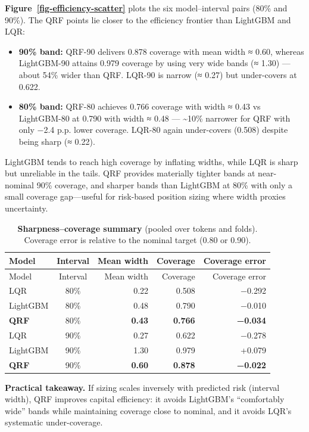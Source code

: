 \documentclass[
  a4paper,
  DIV=11,
  numbers=noendperiod]{scrreprt}
\providecommand{\tightlist}{%
  \setlength{\itemsep}{0pt}\setlength{\parskip}{0pt}}
\begin{document}
\textbf{Figure~\ref{fig-efficiency-scatter}} plots the six
model--interval pairs (80\% and 90\%). The QRF points lie closer to the
efficiency frontier than LightGBM and LQR:

\begin{itemize}
\tightlist
\item
  \textbf{90\% band:} QRF-90 delivers 0.878 coverage with mean width ≈
  0.60, whereas LightGBM-90 attains 0.979 coverage by using very wide
  bands (≈ 1.30) --- about 54\% wider than QRF. LQR-90 is narrow (≈
  0.27) but under-covers at 0.622.
\item
  \textbf{80\% band:} QRF-80 achieves 0.766 coverage with width ≈ 0.43
  vs LightGBM-80 at 0.790 with width ≈ 0.48 --- \textasciitilde10\%
  narrower for QRF with only −2.4 p.p. lower coverage. LQR-80 again
  under-covers (0.508) despite being sharp (≈ 0.22).
\end{itemize}

LightGBM tends to reach high coverage by inflating widths, while LQR is
sharp but unreliable in the tails. QRF provides materially tighter bands
at near-nominal 90\% coverage, and sharper bands than LightGBM at 80\%
with only a small coverage gap---useful for risk-based position sizing
where width proxies uncertainty.

\begin{longtable}[]{@{}lcrrr@{}}
\caption{\textbf{Sharpness--coverage summary} (pooled over tokens and
folds). Coverage error is relative to the nominal target (0.80 or
0.90).}\label{tbl-efficiency-summary}\tabularnewline
\toprule\noalign{}
Model & Interval & Mean width & Coverage & Coverage error \\
\midrule\noalign{}
\endfirsthead
\toprule\noalign{}
Model & Interval & Mean width & Coverage & Coverage error \\
\midrule\noalign{}
\endhead
\bottomrule\noalign{}
\endlastfoot
LQR & 80\% & 0.22 & 0.508 & −0.292 \\
LightGBM & 80\% & 0.48 & 0.790 & −0.010 \\
\textbf{QRF} & 80\% & \textbf{0.43} & \textbf{0.766} &
\textbf{−0.034} \\
LQR & 90\% & 0.27 & 0.622 & −0.278 \\
LightGBM & 90\% & 1.30 & 0.979 & +0.079 \\
\textbf{QRF} & 90\% & \textbf{0.60} & \textbf{0.878} &
\textbf{−0.022} \\
\end{longtable}

\textbf{Practical takeaway.} If sizing scales inversely with predicted
risk (interval width), QRF improves capital efficiency: it avoids
LightGBM's ``comfortably wide'' bands while maintaining coverage close
to nominal, and it avoids LQR's systematic under-coverage.
\end{document}
